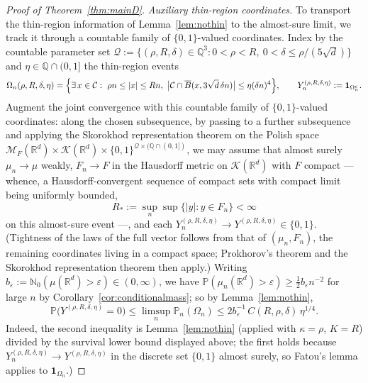 \documentclass[11pt]{article}
\theoremstyle{definition}
\theoremstyle{remark}
\newcommand{\R}{\mathbb{R}}
\newcommand{\bP}{\mathbb{P}}
\newcommand{\bN}{{\mathbb{N}_0}}                 %
\newcommand{\cM}{{\mathcal{M}_F(\R^d)}}          %
\newcommand{\eps}{\varepsilon}
\numberwithin{equation}{section}
\theoremstyle{plain}
\theoremstyle{definition}
\theoremstyle{remark}
\theoremstyle{plain}
\begin{document}
\begin{proof}[Proof of Theorem~\ref{thm:mainD}]
\emph{Auxiliary thin-region coordinates.} To transport the thin-region
information of Lemma~\ref{lem:nothin} to the almost-sure limit, we track it
through a countable family of $\{0,1\}$-valued coordinates. Index by the countable parameter set
$\mathcal Q:=\{(\rho,R,\delta)\in\mathbb Q^3:0<\rho<R,\ 0<\delta\le\rho/(5\sqrt d)\}$
and $\eta\in\mathbb Q\cap(0,1]$ the thin-region events
\[
\Omega_n(\rho,R,\delta,\eta)=\Bigl\{\exists\,x\in \mathcal C:\
\rho n\le|x|\le Rn,\ \bigl|\mathcal C\cap \overline B(x,3\sqrt d\,\delta n)\bigr|\le\eta(\delta n)^4\Bigr\},
\qquad Y_n^{(\rho,R,\delta,\eta)}:=\mathbf 1_{\Omega_n^c}.
\]
Augment the joint convergence with this countable family of $\{0,1\}$-valued
coordinates: along the chosen subsequence, by passing to a further
subsequence and applying the Skorokhod representation theorem on the Polish
space $\cM\times\mathcal K(\R^d)\times\{0,1\}^{\mathcal Q\times(\mathbb Q\cap(0,1])}$, we may assume that almost surely $\mu_n\to\mu$ weakly, $F_n\to F$
in the Hausdorff metric on $\mathcal K(\R^d)$ with $F$ compact ---
whence, a Hausdorff-convergent sequence of compact sets with compact limit
being uniformly bounded,
\[
R_\ast:=\sup_n\sup\{|y|:y\in F_n\}<\infty
\]
on this almost-sure event ---, and each
$Y_n^{(\rho,R,\delta,\eta)}\to Y^{(\rho,R,\delta,\eta)}\in\{0,1\}$.
(Tightness of the laws of the full vector follows from that of
$(\mu_n,F_n)$, the remaining coordinates living in a compact space; Prokhorov's
theorem and the Skorokhod representation theorem then apply.)
Writing
$b_\eps:=\bN(\mu(\R^d)>\eps)\in(0,\infty)$, we have
$\bP(\mu_n(\R^d)>\eps)\ge\tfrac12 b_\eps n^{-2}$ for large $n$ by
Corollary~\ref{cor:conditionalmass}; so by Lemma~\ref{lem:nothin},
\begin{equation}\label{eq:Omegaprob}
\bP\bigl(Y^{(\rho,R,\delta,\eta)}=0\bigr)\le\limsup_n\bP_n(\Omega_n)
\le 2b_\eps^{-1}\,C(R,\rho,\delta)\,\eta^{1/4}.
\end{equation}
Indeed, the second inequality is Lemma~\ref{lem:nothin} (applied with
$\kappa=\rho$, $K=R$) divided by the survival lower bound displayed above; the
first holds because $Y_n^{(\rho,R,\delta,\eta)}\to Y^{(\rho,R,\delta,\eta)}$ in
the discrete set $\{0,1\}$ almost surely, so Fatou's lemma applies to
$\mathbf 1_{\Omega_n}$.)


\end{proof}
\end{document}

